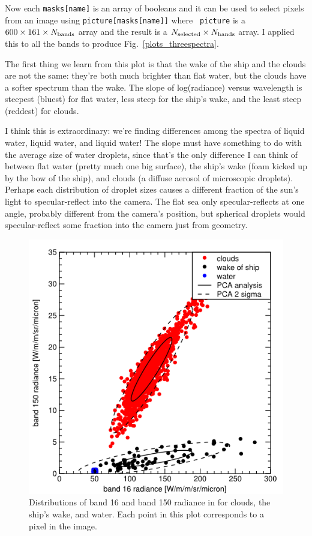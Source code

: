 \documentclass[12pt]{article}
\begin{document}
Now each {\tt masks[name]} is an array of booleans and it can be used
to select pixels from an image using {\tt picture[masks[name]]} where {\tt
  picture} is a $600 \times 161 \times N_{\mbox{\scriptsize bands}}$
array and the result is a $N_{\mbox{\scriptsize selected}} \times
N_{\mbox{\scriptsize bands}}$ array.  I applied this to all the bands
to produce Fig.~\ref{plots_threespectra}.

The first thing we learn from this plot is that the wake of the ship
and the clouds are not the same: they're both much brighter than flat
water, but the clouds have a softer spectrum than the wake.  The
slope of log(radiance) versus wavelength is steepest (bluest) for flat
water, less steep for the ship's wake, and the least steep (reddest)
for clouds.

I think this is extraordinary: we're finding differences among the
spectra of liquid water, liquid water, and liquid water!  The slope
must have something to do with the average size of water droplets,
since that's the only difference I can think of between flat water
(pretty much one big surface), the ship's wake (foam kicked up by the
bow of the ship), and clouds (a diffuse aerosol of microscopic
droplets).  Perhaps each distribution of droplet sizes causes a
different fraction of the sun's light to specular-reflect into the
camera.  The flat sea only specular-reflects at one angle, probably
different from the camera's position, but spherical droplets would
specular-reflect some fraction into the camera just from geometry.

\begin{figure}
\begin{center}
\includegraphics[width=0.75\linewidth]{plots_justtwobands.png}
\end{center}
\caption{Distributions of band 16 and band 150 radiance in for clouds,
  the ship's wake, and water.  Each point in this plot corresponds to
  a pixel in the image. \label{plots_justtwobands}}
\end{figure}
\end{document}
